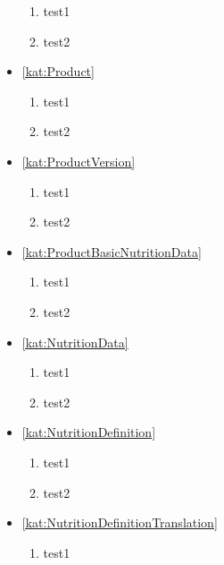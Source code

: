 \begin{itemize}[label={\textbf{Reguły dla}}, wide, labelwidth=!, labelindent=0pt]
    \begin{enumerate}[label={\textbf{REG/\protect\threedigits{\arabic{enumi}}}}, wide, labelwidth=!, resume]
        \item test1
        \item test2
    \end{enumerate}
    \item\ref{kat:Product}
    \begin{enumerate}[label={\textbf{REG/\protect\threedigits{\arabic{enumi}}}}, wide, labelwidth=!, resume]
        \item test1
        \item test2
    \end{enumerate}
    \item\ref{kat:ProductVersion}
    \begin{enumerate}[label={\textbf{REG/\protect\threedigits{\arabic{enumi}}}}, wide, labelwidth=!, resume]
        \item test1
        \item test2
    \end{enumerate}
    \item\ref{kat:ProductBasicNutritionData}
    \begin{enumerate}[label={\textbf{REG/\protect\threedigits{\arabic{enumi}}}}, wide, labelwidth=!, resume]
        \item test1
        \item test2
    \end{enumerate}
    \item\ref{kat:NutritionData}
    \begin{enumerate}[label={\textbf{REG/\protect\threedigits{\arabic{enumi}}}}, wide, labelwidth=!, resume]
        \item test1
        \item test2
    \end{enumerate}
    \item\ref{kat:NutritionDefinition}
    \begin{enumerate}[label={\textbf{REG/\protect\threedigits{\arabic{enumi}}}}, wide, labelwidth=!, resume]
        \item test1
        \item test2
    \end{enumerate}
    \item\ref{kat:NutritionDefinitionTranslation}
    \begin{enumerate}[label={\textbf{REG/\protect\threedigits{\arabic{enumi}}}}, wide, labelwidth=!, resume]
        \item test1

\end{enumerate}
\end{itemize}

